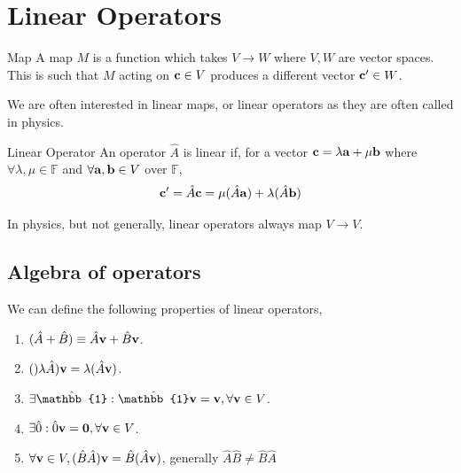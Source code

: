 \documentclass{book}
\begin{document}
\chapter{Linear Operators}
\begin{Definitions}{Map}{}
	A map $M$ is a function which takes $V \to W$ where $V,W$ are vector spaces. This is such that $M$ acting on $\vb{c} \in V$ produces a different vector $\vb{c}' \in W$.
\end{Definitions}
We are often interested in linear maps, or linear operators as they are often called in physics.
\begin{Definitions}{Linear Operator}{}
	An operator $\hat{A}$ is linear if, for a vector $\vb{c} = \lambda \vb{a} + \mu\vb{b}$ where $\forall \lambda, \mu \in \mathbb{F}$ and $\forall \vb{a},\vb{b} \in V$ over $\mathbb{F}$, 
	\begin{equation}
		\vb{c}' = \hat{A}\vb{c} = \mu(\hat{A}\vb{a})+ \lambda (\hat{A}\vb{b})
	\end{equation}
\end{Definitions}
In physics, but not generally, linear operators always map $V \to V$.
\section{Algebra of operators}
We can define the following properties of linear operators,
\begin{enumerate}
	\item $(\hat{A} + \hat{B}) \equiv \hat{A}\vb{v} + \hat{B} \vb{v}$.
	\item $()\lambda\hat{A})\vb{v} = \lambda(\hat{A}\vb{v})$.
	\item $\exists\hat{\mathbb{1}} : \hat{\mathbb{1}}\vb{v} = \vb{v}, \forall \vb{v} \in V$.
	\item $\exists \hat{0} : \hat{0}\vb{v} = \vb{0}, \forall \vb{v} \in V$.
	\item $\forall \vb{v} \in V, (\hat{B}\hat{A})\vb{v} = \hat{B}(\hat{A}\vb{v})$, generally $\hat{A} \hat{B} \neq \hat{B}\hat{A}$
\end{enumerate}
\end{document}
